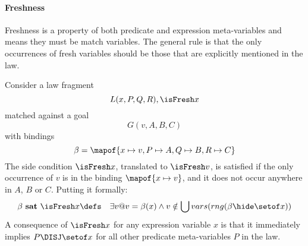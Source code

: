 \paragraph{Freshness}
Freshness is a property of both predicate and expression meta-variables and
means they must be match variables.
The general rule is that the only occurrences of fresh variables should be those that
are explicitly mentioned in the law.

Consider a law fragment
$$L(x,P,Q,R), \isFresh x$$
matched against a goal
$$G(v,A,B,C)$$
with bindings
$$
 \beta = \mapof{x \mapsto v, P \mapsto A, Q \mapsto B, R \mapsto C}
$$
The side condition $\isFresh x$, translated to $\isFresh v$, is satisfied if the only occurrence of $v$ is in the binding $\mapof{x \mapsto v}$, and it does not occur anywhere in  $A$, $B$ or $C$. Putting it formally:
\begin{eqnarray*}
 \beta~\textbf{sat}~\isFresh x
 &\defs&
 \exists v @ v=\beta(x) \land v \notin \bigcup vars(rng(\beta\hide\setof x))
\end{eqnarray*}
A consequence of $\isFresh x$ for any expression variable $x$
is that it immediately implies $P \DISJ \setof x$
for all other predicate meta-variables $P$ in the law.
